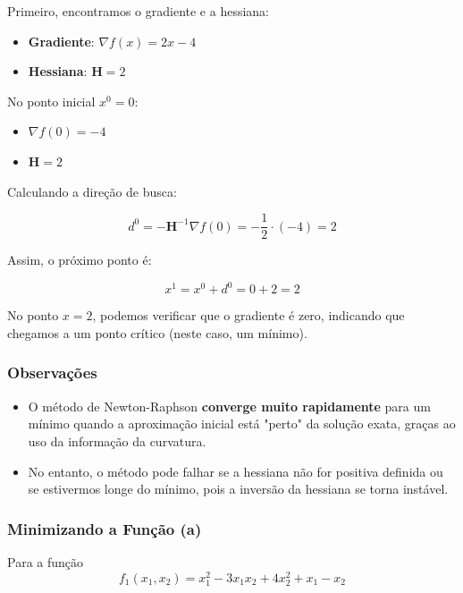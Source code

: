 \documentclass[a4paper, 12pt]{article}
\begin{document}
Primeiro, encontramos o gradiente e a hessiana:
\begin{itemize}
    \item \textbf{Gradiente}: $\nabla f(x) = 2x - 4$
    \item \textbf{Hessiana}: $\mathbf{H} = 2$
\end{itemize}

No ponto inicial $x^0 = 0$:
\begin{itemize}
    \item $\nabla f(0) = -4$
    \item $\mathbf{H} = 2$
\end{itemize}

Calculando a direção de busca:

\begin{equation}
    d^0 = -\mathbf{H}^{-1} \nabla f(0) = -\frac{1}{2} \cdot (-4) = 2
\end{equation}

Assim, o próximo ponto é:

\begin{equation}
    x^1 = x^0 + d^0 = 0 + 2 = 2
\end{equation}

No ponto $x = 2$, podemos verificar que o gradiente é zero, indicando que chegamos a um ponto crítico (neste caso, um mínimo).

\subsubsection{Observações}

\begin{itemize}
    \item O método de Newton-Raphson \textbf{converge muito rapidamente} para um mínimo quando a aproximação inicial está "perto" da solução exata, graças ao uso da informação da curvatura.
    \item No entanto, o método pode falhar se a hessiana não for positiva definida ou se estivermos longe do mínimo, pois a inversão da hessiana se torna instável.
\end{itemize}



\subsubsection{Minimizando a Função (a)}

Para a função 
\[
f_1(x_1, x_2) = x_1^2 - 3x_1x_2 + 4x_2^2 + x_1 - x_2
\]
\end{document}
